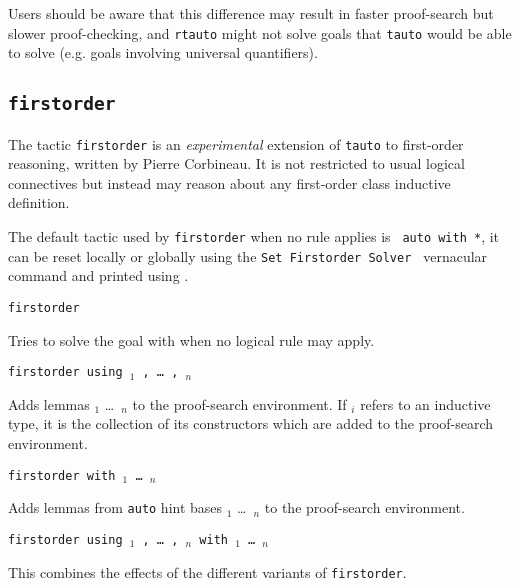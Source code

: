 \begin{coq_example*}
Users should be aware that this difference may result in faster proof-search but  slower proof-checking, and {\tt rtauto} might not solve goals that {\tt tauto} would be able to solve (e.g. goals involving universal quantifiers).

\subsection{\tt firstorder}
\label{firstorder}

The tactic \texttt{firstorder} is an {\it experimental} extension of
\texttt{tauto} to
first-order reasoning, written by Pierre Corbineau.
It is not restricted to usual logical connectives but
instead may reason about any first-order class inductive definition.

The default tactic used by \texttt{firstorder} when no rule applies is {\tt
  auto with *}, it can be reset locally or globally using the {\nobreak
  {\tt Set Firstorder Solver {\tac}}} 
vernacular command and printed using {}.

\begin{Variants}
 \item {\tt firstorder {\tac}}

   Tries to solve the goal with {\tac} when no logical rule may apply.

 \item {\tt firstorder using {\qualid}$_1$ , \dots\ , {\qualid}$_n$ }

   Adds lemmas {\qualid}$_1$ \dots\ {\qualid}$_n$ to the proof-search
   environment. If {\qualid}$_i$ refers to an inductive type, it is
   the collection of its constructors which are added to the
   proof-search environment.

 \item {\tt firstorder with \ident$_1$ \dots\ \ident$_n$ }

   Adds lemmas from {\tt auto} hint bases \ident$_1$ \dots\ \ident$_n$
   to the proof-search environment.

\item \texttt{firstorder {\tac} using {\qualid}$_1$ , \dots\ , {\qualid}$_n$ with \ident$_1$ \dots\ \ident$_n$}

  This combines the effects of the different variants of \texttt{firstorder}.

\end{Variants}


\end{coq_example*}
